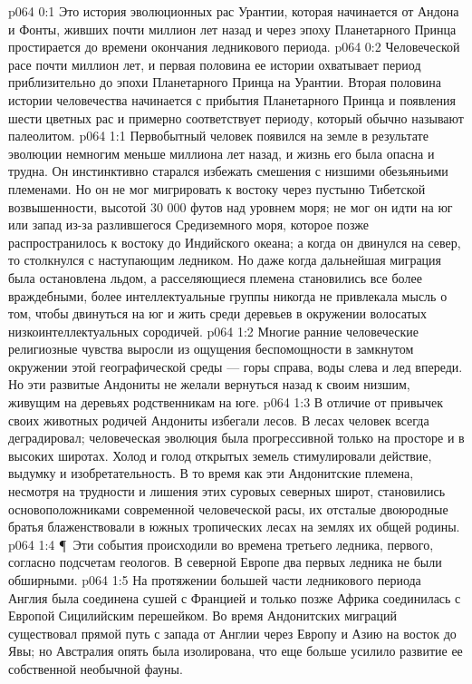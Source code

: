 \author{Носитель Жизни}
\vs p064 0:1 Это история эволюционных рас Урантии, которая начинается от Андона и Фонты, живших почти миллион лет назад и через эпоху Планетарного Принца простирается до времени окончания ледникового периода.
\vs p064 0:2 Человеческой расе почти миллион лет, и первая половина ее истории охватывает период приблизительно до эпохи Планетарного Принца на Урантии. Вторая половина истории человечества начинается с прибытия Планетарного Принца и появления шести цветных рас и примерно соответствует периоду, который обычно называют палеолитом.
\vs p064 1:1 Первобытный человек появился на земле в результате эволюции немногим меньше миллиона лет назад, и жизнь его была опасна и трудна. Он инстинктивно старался избежать смешения с низшими обезьяньими племенами. Но он не мог мигрировать к востоку через пустыню Тибетской возвышенности, высотой 30 000 футов над уровнем моря; не мог он идти на юг или запад из\hyp{}за разлившегося Средиземного моря, которое позже распространилось к востоку до Индийского океана; а когда он двинулся на север, то столкнулся с наступающим ледником. Но даже когда дальнейшая миграция была остановлена льдом, а расселяющиеся племена становились все более враждебными, более интеллектуальные группы никогда не привлекала мысль о том, чтобы двинуться на юг и жить среди деревьев в окружении волосатых низкоинтеллектуальных сородичей.
\vs p064 1:2 Многие ранние человеческие религиозные чувства выросли из ощущения беспомощности в замкнутом окружении этой географической среды --- горы справа, воды слева и лед впереди. Но эти развитые Андониты не желали вернуться назад к своим низшим, живущим на деревьях родственникам на юге.
\vs p064 1:3 В отличие от привычек своих животных родичей Андониты избегали лесов. В лесах человек всегда деградировал; человеческая эволюция была прогрессивной только на просторе и в высоких широтах. Холод и голод открытых земель стимулировали действие, выдумку и изобретательность. В то время как эти Андонитские племена, несмотря на трудности и лишения этих суровых северных широт, становились основоположниками современной человеческой расы, их отсталые двоюродные братья блаженствовали в южных тропических лесах на землях их общей родины.
\vs p064 1:4 \P\ Эти события происходили во времена третьего ледника, первого, согласно подсчетам геологов. В северной Европе два первых ледника не были обширными.
\vs p064 1:5 На протяжении большей части ледникового периода Англия была соединена сушей с Францией и только позже Африка соединилась с Европой Сицилийским перешейком. Во время Андонитских миграций существовал прямой путь с запада от Англии через Европу и Азию на восток до Явы; но Австралия опять была изолирована, что еще больше усилило развитие ее собственной необычной фауны.
